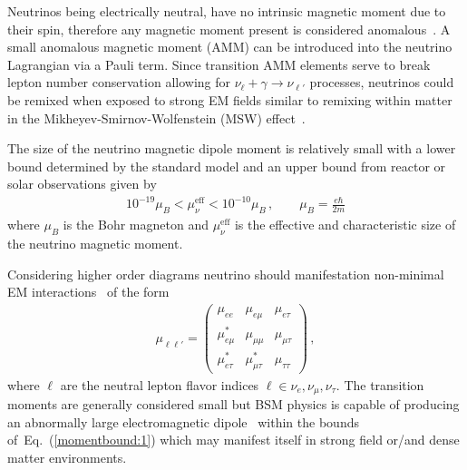 \documentclass[addchapnum]{ws-rv961x669} %
\newcommand{\req}[1]{Eq.~(\ref{#1})}
\begin{document}
Neutrinos being electrically neutral, have no intrinsic magnetic moment due to their spin, therefore any magnetic moment present is considered anomalous~\cite{Steinmetz:2018ryf}. A small anomalous magnetic moment (AMM) can be introduced into the neutrino Lagrangian via a Pauli term. Since transition AMM elements serve to break lepton number conservation allowing for $\nu_{\ell}+\gamma\rightarrow\nu_{\ell'}$ processes, neutrinos could be remixed when exposed to strong EM fields similar to remixing within matter in the Mikheyev-Smirnov-Wolfenstein (MSW) effect~\citep{Wolfenstein:1977ue,Mikheyev:1985zog}.

The size of the neutrino magnetic dipole moment is relatively small with a lower bound determined by the standard model and an upper bound from reactor or solar observations given by~\citep{Studenikin:2016ykv,Canas:2015yoa,AristizabalSierra:2021fuc}
\begin{align}
    \label{momentbound:1}
    10^{-19}\mu_{B}<\mu_{\nu}^\mathrm{eff}<10^{-10}\mu_{B}\,,\qquad\mu_{B}=\frac{e\hbar}{2m}
\end{align}
where $\mu_{B}$ is the Bohr magneton and $\mu_{\nu}^\mathrm{eff}$ is the effective and characteristic size of the neutrino magnetic moment.

Considering higher order diagrams neutrino should manifestation non-minimal EM interactions~\citep{Shrock:1980vy} of the form
\begin{align}
    \label{mu:1}
    \mu_{\ell\ell'}=
	\begin{pmatrix}
		\mu_{ee} & \mu_{e\mu} & \mu_{e\tau} \\
		\mu_{e\mu}^{*} & \mu_{\mu\mu} & \mu_{\mu\tau} \\
		\mu_{e\tau}^{*} & \mu_{\mu\tau}^{*} & \mu_{\tau\tau}
	\end{pmatrix}\,,
\end{align}
where $\ell$ are the neutral lepton flavor indices $\ell\in\nu_{e},\nu_{\mu},\nu_{\tau}$. The transition moments are generally considered small but BSM physics is capable of producing an abnormally large electromagnetic dipole~\citep{Ohlsson:2012kf,Lindner:2017uvt,Brdar:2020quo} within the bounds of~\req{momentbound:1} which may manifest itself in strong field or/and dense matter environments.

\end{document}
